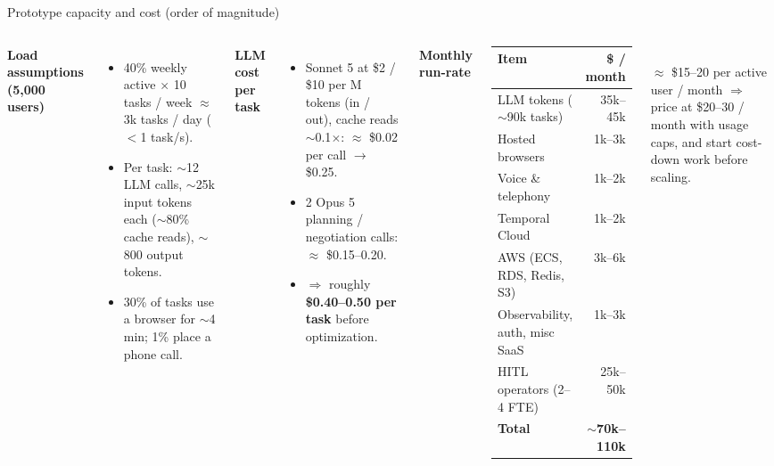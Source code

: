 \documentclass[aspectratio=169,10pt]{beamer}
\begin{document}
\begin{frame}{Prototype capacity and cost (order of magnitude)}
\begin{columns}[T]
\small
\textbf{Load assumptions (5,000 users)}
\begin{itemize}
  \item 40\% weekly active $\times$ 10 tasks / week $\approx$ 3k tasks / day ($<$1 task/s).
  \item Per task: $\sim$12 LLM calls, $\sim$25k input tokens each ($\sim$80\% cache reads), $\sim$800 output tokens.
  \item 30\% of tasks use a browser for $\sim$4 min; 1\% place a phone call.
\end{itemize}
\textbf{LLM cost per task}
\begin{itemize}
  \item Sonnet 5 at \$2 / \$10 per M tokens (in / out), cache reads $\sim$0.1$\times$: $\approx$ \$0.02 per call $\rightarrow$ \$0.25.
  \item 2 Opus 5 planning / negotiation calls: $\approx$ \$0.15--0.20.
  \item $\Rightarrow$ roughly \textbf{\$0.40--0.50 per task} before optimization.
\end{itemize}
\small
\textbf{Monthly run-rate}\\[3pt]
\scriptsize
\begin{tabular}{l r}
\toprule
Item & \$ / month\\
\midrule
LLM tokens ($\sim$90k tasks) & 35k--45k\\
Hosted browsers & 1k--3k\\
Voice \& telephony & 1k--2k\\
Temporal Cloud & 1k--2k\\
AWS (ECS, RDS, Redis, S3) & 3k--6k\\
Observability, auth, misc SaaS & 1k--3k\\
HITL operators (2--4 FTE) & 25k--50k\\
\midrule
\textbf{Total} & \textbf{$\sim$70k--110k}\\
\bottomrule
\end{tabular}\\[4pt]
{\small $\approx$ \$15--20 per active user / month $\Rightarrow$ price at \$20--30 / month with usage caps, and start cost-down work before scaling.}
\end{columns}
\end{frame}

\end{document}
